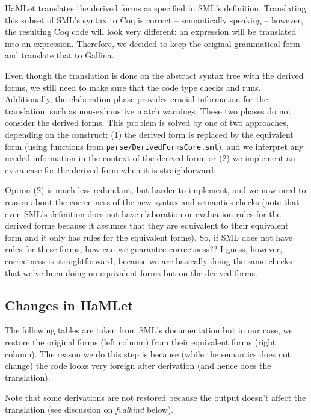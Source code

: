 \documentclass[a4paper,11pt]{article}
\begin{document}
HaMLet translates the derived forms as specified in SML's definition.
Translating this subset of SML's syntax to Coq is correct -- semantically
speaking -- however, the resulting Coq code will look very different: an
 expression will be translated into an 
expression. Therefore, we decided to keep the original grammatical form and
translate that to Gallina.

Even though the translation is done on the abstract syntax tree with
the derived forms, we still need to make sure that the code type
checks and runs.  Additionally, the elaboration phase provides crucial
information for the translation, such as non-exhaustive match
warnings. These two phases do not consider the derived forms. This
problem is solved by one of two approaches, depending on the
construct: (1) the derived form is replaced by the equivalent form
(using functions from \texttt{parse/DerivedFormsCore.sml}), and we
interpret any needed information in the context of the derived form;
or (2) we implement an extra case for the derived form when it is
straighforward.

Option (2) is much less redundant, but harder to implement, and we now
need to reason about the correctness of the new syntax and semantics
checks (note that even SML's definition does not have elaboration or
evaluation rules for the derived forms because it assumes that they are
equivalent to their equivalent form and it only has rules for the
equivalent forms). So, if SML does not have rules for these forms, how can
we guarantee correctness?? I guess, however, correctness is
straightforward, because we are basically doing the same checks that
we've been doing on equivalent forms but on the derived forms.

\subsection{Changes in HaMLet}

The following tables are taken from SML's documentation but in our case, we
restore the original forms (left column) from their equivalent forms (right
column). The reason we do this step is because (while the semantics does not
change) the code looks very foreign after derivation (and hence does the
translation).

Note that some derivations are not restored because the output doesn't affect
the translation (see discussion on \emph{fvalbind} below). 

\newcommand\changedto{\Longrightarrow}
\end{document}
